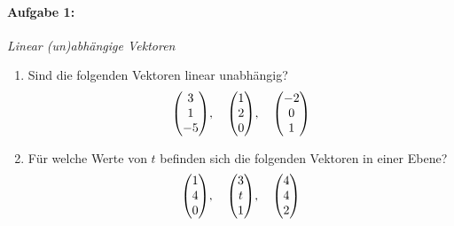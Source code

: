 
\paragraph{Aufgabe 1: } \emph{Linear (un)abhängige Vektoren}
\begin{multicols}{2}
    \begin{enumerate}[label=(\alph*)]
    \item Sind die folgenden Vektoren linear unabhängig?
    \begin{align*}
    \mqty( 3\\1\\-5 ),\quad \mqty( 1\\2\\0 ),\quad \mqty(-2\\0\\1)
    \end{align*}
    \item Für welche Werte von $t$ befinden sich die folgenden Vektoren in einer Ebene?
    \begin{align*}
    \mqty( 1\\4\\0 ),\quad \mqty( 3\\t\\1 ),\quad \mqty( 4\\4\\2 )
    \end{align*}
    \end{enumerate}
\end{multicols}
%
